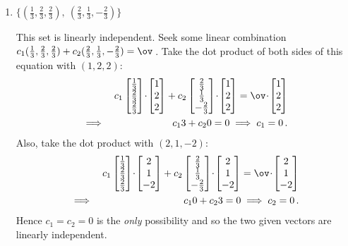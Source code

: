 \begin{example}
\begin{enumerate}[ref=\ref{eg:lindep}(\alph*)]
\item \(\{(\frac13,\frac23,\frac23),\ (\frac23,\frac13,-\frac23)\}\)
\begin{solution} 
This set is linearly independent.
Seek some linear combination \(c_1(\frac13,\frac23,\frac23) +c_2(\frac23,\frac13,-\frac23) =\ov\)\,.
Take the dot product of both sides of this equation with \((1,2,2)\):
\begin{eqnarray*}
&&c_1\begin{bmatrix}\frac13\\\frac23\\\frac23 \end{bmatrix}\cdot\begin{bmatrix} 1\\2\\2 \end{bmatrix} +c_2\begin{bmatrix} \frac23\\\frac13\\-\frac23 \end{bmatrix}\cdot\begin{bmatrix} 1\\2\\2 \end{bmatrix} =\ov\cdot\begin{bmatrix} 1\\2\\2 \end{bmatrix}
\\\implies&& c_13+c_20=0
\implies c_1=0\,.
\end{eqnarray*}
Also, take the dot product with \((2,1,-2)\): 
\begin{eqnarray*}
&&c_1\begin{bmatrix}\frac13\\\frac23\\\frac23 \end{bmatrix}\cdot\begin{bmatrix} 2\\1\\-2 \end{bmatrix} +c_2\begin{bmatrix} \frac23\\\frac13\\-\frac23 \end{bmatrix}\cdot\begin{bmatrix} 2\\1\\-2 \end{bmatrix} =\ov\cdot\begin{bmatrix} 2\\1\\-2 \end{bmatrix}
\\\implies&& c_10+c_23=0
\implies c_2=0\,.
\end{eqnarray*}
Hence \(c_1=c_2=0\) is the \emph{only} possibility and so the two given vectors are linearly independent.
\end{solution}


\end{enumerate}
\end{example}
